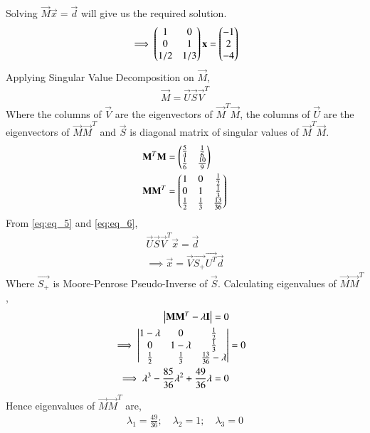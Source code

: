 \documentclass[journal,12pt,twocolumn]{IEEEtran}
\begin{document}
Solving $\vec{M}\vec{x}=\vec{d}$ will give us the required solution. 
\begin{align} \label{eq:eq_5}
    \implies \begin{pmatrix}1 & 0 \\ 0 & 1 \\ 1/2 & 1/3\end{pmatrix}\mathbf{x} = \begin{pmatrix}-1 \\ 2 \\ -4\end{pmatrix}
\end{align}
Applying Singular Value Decomposition on $\vec{M}$,
\begin{align} \label{eq:eq_6}
    \vec{M}=\vec{U}\vec{S}\vec{V}^T
\end{align}
Where the columns of $\vec{V}$ are the eigenvectors of $\vec{M}^T\vec{M}$, the columns of $\vec{U}$ are the eigenvectors of $\vec{M}\vec{M}^T$ and $\vec{S}$ is diagonal matrix of singular values of $\vec{M}^T\vec{M}$.
\begin{align}
    \mathbf{M}^T \mathbf{M} &= \begin{pmatrix}\tfrac{5}{4} & \tfrac{1}{6}  \\\tfrac{1}{6}  & \tfrac{10}{9} \end{pmatrix}\label{eq:eq_7} \\
    \mathbf{M} \mathbf{M}^T &= \begin{pmatrix}1 & 0 & \frac{1}{2}\\ 0 & 1 & \frac{1}{3} \\ \tfrac{1}{2} & \tfrac{1}{3} & \tfrac{13}{36}\end{pmatrix} \label{eq:eq_8}
\end{align}
From \eqref{eq:eq_5} and \eqref{eq:eq_6},
\begin{align}
    \vec{U} \vec{S} \vec{V}^T \vec{x} = \vec{d} \nonumber \\
    \implies \vec{x} = \vec{V} \vec{S_+} \vec{U^T} \vec{d} \label{eq:eq_9}
\end{align}
Where $\vec{S_+}$ is Moore-Penrose Pseudo-Inverse of $\vec{S}$. Calculating eigenvalues of $\vec{M}\vec{M}^T$,
\begin{align}
    \begin{vmatrix}\mathbf{M} \mathbf{M}^T - \lambda \mathbf{I}\end{vmatrix} = 0 \nonumber \\
    \implies \begin{vmatrix}1-\lambda & 0 & \frac{1}{2} \\ 0 & 1-\lambda & \frac{1}{3} \\ \frac{1}{2} & \frac{1}{3} & \frac{13}{36}-\lambda\end{vmatrix} &= 0 \nonumber \\
    \implies \lambda^3 - \frac{85}{36}\lambda^2 + \frac{49}{36}\lambda =0 \nonumber
\end{align}
Hence eigenvalues of $\vec{M}\vec{M}^T$ are,
\begin{align} \label{eq:eq_10}
    \lambda_1 = \frac{49}{36}; \quad \lambda_2 = 1; \quad \lambda_3 =0
\end{align}
\end{document}
